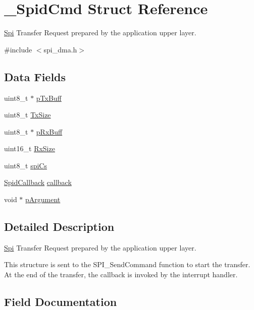\hypertarget{struct__SpidCmd}{}\section{\+\_\+\+Spid\+Cmd Struct Reference}
\label{struct__SpidCmd}


\mbox{\hyperlink{structSpi}{Spi}} Transfer Request prepared by the application upper layer.  




{\ttfamily \#include $<$spi\+\_\+dma.\+h$>$}

\subsection*{Data Fields}
\begin{DoxyCompactItemize}
\item 
uint8\+\_\+t $\ast$ \mbox{\hyperlink{struct__SpidCmd_a8e9184d79c2c9596b668d0726a661219}{p\+Tx\+Buff}}
\item 
uint8\+\_\+t \mbox{\hyperlink{struct__SpidCmd_ad23102062c57ef35dbbbf0feda93a655}{Tx\+Size}}
\item 
uint8\+\_\+t $\ast$ \mbox{\hyperlink{struct__SpidCmd_a8ed8d7ecd404eb582977063a17c11b20}{p\+Rx\+Buff}}
\item 
uint16\+\_\+t \mbox{\hyperlink{struct__SpidCmd_ad780f449e7e213cf84dba3d976d4c1e1}{Rx\+Size}}
\item 
uint8\+\_\+t \mbox{\hyperlink{struct__SpidCmd_a25877429b448b90f258036306905bf7f}{spi\+Cs}}
\item 
\mbox{\hyperlink{spi__dma_8h_aebc642e37d24ab8f4151260c8a268541}{Spid\+Callback}} \mbox{\hyperlink{struct__SpidCmd_aad1e93cf4fdd6f8dd9454c6fbf75ede7}{callback}}
\item 
void $\ast$ \mbox{\hyperlink{struct__SpidCmd_a2d48379f1fe6744b5f814da190b43b8d}{p\+Argument}}
\end{DoxyCompactItemize}


\subsection{Detailed Description}
\mbox{\hyperlink{structSpi}{Spi}} Transfer Request prepared by the application upper layer. 

This structure is sent to the S\+P\+I\+\_\+\+Send\+Command function to start the transfer. At the end of the transfer, the callback is invoked by the interrupt handler. 

\subsection{Field Documentation}
\mbox{\label{struct__SpidCmd_aad1e93cf4fdd6f8dd9454c6fbf75ede7}} 
